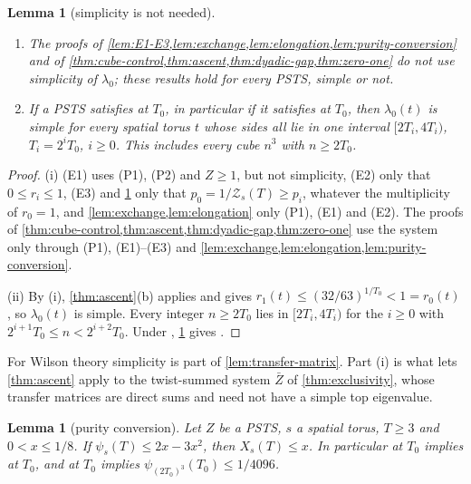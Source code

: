 \documentclass[11pt,a4paper]{amsart}
\newtheorem{lemma}[theorem]{Lemma}
\theoremstyle{definition}
\theoremstyle{remark}
\numberwithin{equation}{section}
\newcommand{\PSTS}{\textup{PSTS}}          %
\newcommand{\TT}{\mathbb{T}}               %
\newcommand{\Zc}{\mathcal{Z}}              %
\newcommand{\Zs}[2]{\Zc_{#1}(#2)}          %
\newcommand{\XT}[2]{X_{#1}(#2)}            %
\newcommand{\psiT}[2]{\psi_{#1}(#2)}       %
\newcommand{\cube}[1]{(2#1)^3}             %
\newcommand{\lzero}{\lambda_0}             %
\newcommand{\Mcirc}{\text{\upshape(M$^{\circ}$)}}   %
\newcommand{\Bcirc}{\text{\upshape(B$^{\circ}$)}}   %
\begin{document}
\begin{lemma}[simplicity is not needed]\label{lem:simplicity-not-needed}
\begin{enumerate}[label=(\roman*)]
\item The proofs of \cref{lem:E1-E3,lem:exchange,lem:elongation,lem:purity-conversion} and of \cref{thm:cube-control,thm:ascent,thm:dyadic-gap,thm:zero-one} do not use simplicity of $\lzero$; these results hold for every \PSTS{}, simple or not.
\item If a \PSTS{} satisfies \Bcirc{} at $T_0$, in particular if it satisfies \Mcirc{} at $T_0$, then $\lzero(t)$ is simple for every spatial torus $t$ whose sides all lie in one interval $[2T_i,4T_i)$, $T_i=2^iT_0$, $i\ge0$. This includes every cube $n^3$ with $n\ge2T_0$.
\end{enumerate}
\end{lemma}

\begin{proof}
(i) (E1) uses (P1), (P2) and $Z\ge1$, but not simplicity, (E2) only that $0\le r_i\le1$, (E3) and \cref{lem:purity-conversion} only that $p_0=1/\Zs{s}{T}\ge p_i$, whatever the multiplicity of $r_0=1$, and \cref{lem:exchange,lem:elongation} only (P1), (E1) and (E2). The proofs of \cref{thm:cube-control,thm:ascent,thm:dyadic-gap,thm:zero-one} use the system only through (P1), (E1)--(E3) and \cref{lem:exchange,lem:elongation,lem:purity-conversion}.

(ii) By (i), \cref{thm:ascent}(b) applies and gives $r_1(t)\le(32/63)^{1/T_0}<1=r_0(t)$, so $\lzero(t)$ is simple. Every integer $n\ge2T_0$ lies in $[2T_i,4T_i)$ for the $i\ge0$ with $2^{i+1}T_0\le n<2^{i+2}T_0$. Under \Mcirc{}, \cref{lem:purity-conversion} gives \Bcirc{}.
\end{proof}

For Wilson theory simplicity is part of \cref{lem:transfer-matrix}. Part (i) is what lets \cref{thm:ascent} apply to the twist-summed system $\bar Z$ of \cref{thm:exclusivity}, whose transfer matrices are direct sums and need not have a simple top eigenvalue.

\begin{lemma}[purity conversion]\label{lem:purity-conversion}
Let $Z$ be a \PSTS{}, $s$ a spatial torus, $T\ge3$ and $0<x\le1/8$. If $\psiT{s}{T}\le2x-3x^2$, then $\XT{s}{T}\le x$. In particular \Mcirc{} at $T_0$ implies \Bcirc{} at $T_0$, and \Bcirc{} at $T_0$ implies $\psiT{\cube{T_0}}{T_0}\le1/4096$.
\end{lemma}
\end{document}

